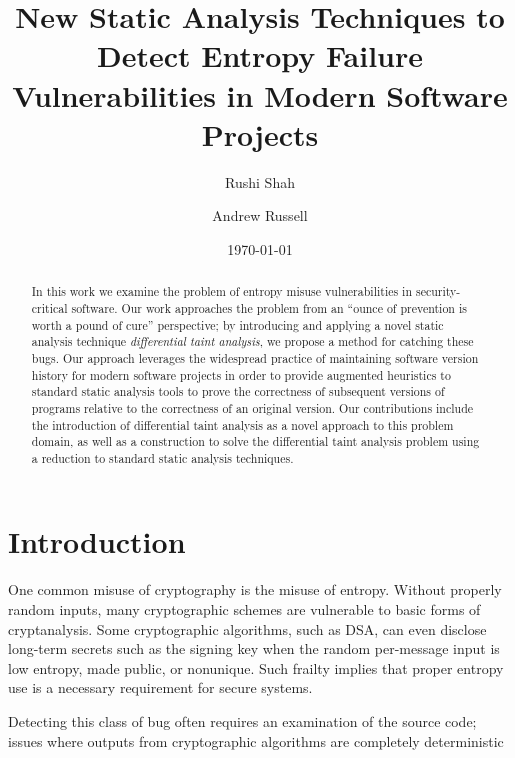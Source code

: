 \documentclass[letterpaper,twocolumn,10pt]{article}
\begin{document}
\date{\today}

\title{\Large \bf New Static Analysis Techniques to Detect Entropy Failure Vulnerabilities in Modern Software Projects}

\author{
{\rm Rushi Shah}
\and
{\rm Andrew Russell}
}

\maketitle

\begin{abstract}
    In this work we examine the problem of entropy misuse vulnerabilities in
    security-critical software. Our work approaches the problem from an
    ``ounce of prevention is worth a pound of cure'' perspective; by introducing
    and applying a novel static analysis technique \emph{differential taint analysis},
    we propose a method for catching these bugs. Our approach
    leverages the widespread practice of maintaining software version history for
    modern software projects in order to
     provide augmented heuristics to standard static analysis tools to prove the correctness of
     subsequent versions of programs relative to the correctness of an original version.
     Our contributions include the introduction of differential taint analysis
     as a novel approach to this problem domain, as well as a construction to solve
     the differential taint analysis problem using a reduction to standard static
     analysis techniques.
\end{abstract}

\section{Introduction}

One common misuse of cryptography is the misuse of entropy. Without properly random inputs, many cryptographic schemes
are vulnerable to basic forms of cryptanalysis. Some cryptographic algorithms, such as DSA, can even disclose long-term secrets
such as the signing key when the random per-message input is low entropy, made public, or nonunique. Such frailty implies that
proper entropy use is a necessary requirement for secure systems.

Detecting this class of bug often requires an examination of the source code; 
issues where outputs from cryptographic algorithms are completely deterministic
\end{document}
